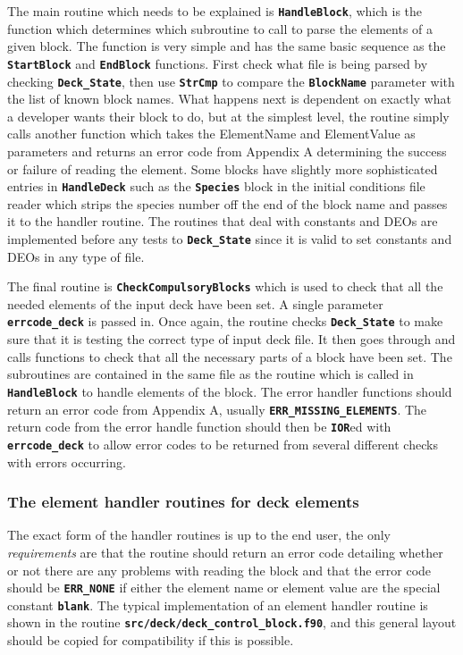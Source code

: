 \documentclass[12pt]{article}
\newcommand{\inlinecode}[1]{{\color{warwickred} \bf\texttt{#1}}}
\begin{document}
The main routine which needs to be explained is \inlinecode{HandleBlock}, which
is the function which determines which subroutine to call to parse the elements
of a given block. The function is very simple and has the same basic sequence
as the \inlinecode{StartBlock} and \inlinecode{EndBlock} functions. First check
what file is being parsed by checking \inlinecode{Deck\_State}, then use
\inlinecode{StrCmp} to compare the \inlinecode{BlockName} parameter with the
list of known block names. What happens next is dependent on exactly what a
developer wants their block to do, but at the simplest level, the routine
simply calls another function which takes the ElementName and ElementValue as
parameters and returns an error code from Appendix A determining the success or
failure of reading the element. Some blocks have slightly more sophisticated
entries in \inlinecode{HandleDeck} such as the \inlinecode{Species} block in
the initial conditions file reader which strips the species number off the end
of the block name and passes it to the handler routine. The routines that deal
with constants and DEOs are implemented before any tests to
\inlinecode{Deck\_State} since it is valid to set constants and DEOs in any
type of file.

The final routine is \inlinecode{CheckCompulsoryBlocks} which is used to check
that all the needed elements of the input deck have been set. A single
parameter \inlinecode{errcode\_deck} is passed in. Once again, the routine
checks \inlinecode{Deck\_State} to make sure that it is testing the correct
type of input deck file. It then goes through and calls functions to check that
all the necessary parts of a block have been set. The subroutines are contained
in the same file as the routine which is called in \inlinecode{HandleBlock} to
handle elements of the block. The error handler functions should return an
error code from Appendix A, usually \inlinecode{ERR\_MISSING\_ELEMENTS}. The
return code from the error handle function should then be \inlinecode{IOR}ed
with \inlinecode{errcode\_deck} to allow error codes to be returned from
several different checks with errors occurring.

\subsubsection{The element handler routines for deck elements}
The exact form of the handler routines is up to the end user, the only {\it
requirements} are that the routine should return an error code detailing
whether or not there are any problems with reading the block and that the error
code should be \inlinecode{ERR\_NONE} if either the element name or element
value are the special constant \inlinecode{blank}. The typical implementation
of an element handler routine is shown in the routine
\inlinecode{src/deck/deck\_control\_block.f90}, and this general layout should
be copied for compatibility if this is possible.\\
\end{document}
